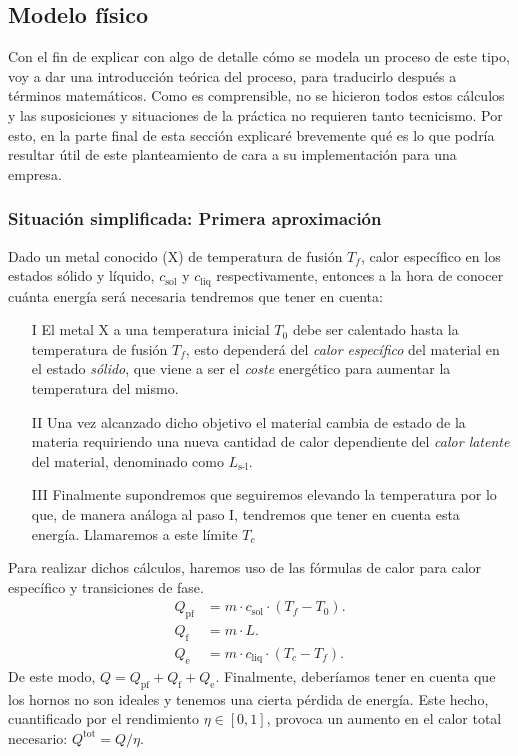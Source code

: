 \subsection{Modelo físico}
%
%
Con el fin de explicar con algo de detalle cómo se modela un proceso de este tipo, voy a dar una introducción teórica del proceso, para traducirlo después a términos matemáticos. Como es comprensible, no se hicieron todos estos cálculos y las suposiciones y situaciones de la práctica no requieren tanto tecnicismo. Por esto, en la parte final de esta sección explicaré brevemente qué es lo que podría resultar útil de este planteamiento de cara a su implementación para una empresa.
%
%
%
\subsubsection{Situación simplificada: Primera aproximación} \label{PrimeraAproximacion}
%
%
%
Dado un metal conocido (X) de temperatura de fusión $T_f$, calor específico en los estados sólido y líquido, $c_{\text{sol}}$ y $c_{\text{liq}}$ respectivamente, entonces a la hora de conocer cuánta energía será necesaria tendremos que tener en cuenta:
\begin{itemize}
    \item[I] El metal X a una temperatura inicial $T_0$ debe ser calentado hasta la temperatura de fusión $T_f$, esto dependerá del \textit{calor específico} del material en el estado \textit{sólido}, que viene a ser el \textit{coste} energético para aumentar la temperatura del mismo.
    \item[II] Una vez alcanzado dicho objetivo el material cambia de estado de la materia requiriendo una nueva cantidad de calor dependiente del \textit{calor latente} del material, denominado como $L_{\text{s-l}}$.
    \item[III] Finalmente supondremos que seguiremos elevando la temperatura por lo que, de manera análoga al paso I, tendremos que tener en cuenta esta energía. Llamaremos a este límite $T_c$
\end{itemize}
Para realizar dichos cálculos, haremos uso de las fórmulas de calor para calor específico y transiciones de fase.
\begin{align}
    Q_{\text{pf}} &= m \cdot c_{\text{sol}} \cdot (T_f-T_0).\\
    Q_{\text{f}} &= m \cdot L.\\
    Q_{\text{e}} &= m \cdot c_{\text{liq}} \cdot (T_c-T_f).
\end{align}
De este modo, $Q = Q_{\text{pf}} + Q_{\text{f}} + Q_{\text{e}}$. Finalmente, deberíamos tener en cuenta que los hornos no son ideales y tenemos una cierta pérdida de energía. Este hecho, cuantificado por el rendimiento $\eta \in [0,1]$, provoca un aumento en el calor total necesario: $Q^{\text{tot}} = Q/\eta$.

